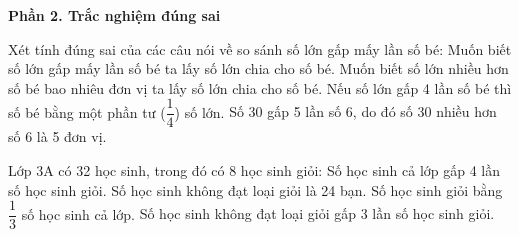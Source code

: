 \textbf{Phần 2. Trắc nghiệm đúng sai}

\begin{ex} %
Xét tính đúng sai của các câu nói về so sánh số lớn gấp mấy lần số bé:
\choiceTF
{\True Muốn biết số lớn gấp mấy lần số bé ta lấy số lớn chia cho số bé.}
{Muốn biết số lớn nhiều hơn số bé bao nhiêu đơn vị ta lấy số lớn chia cho số bé.}
{\True Nếu số lớn gấp 4 lần số bé thì số bé bằng một phần tư ($\dfrac{1}{4}$) số lớn.}
{Số 30 gấp 5 lần số 6, do đó số 30 nhiều hơn số 6 là 5 đơn vị.}
\end{ex}

\begin{ex} %
Lớp 3A có 32 học sinh, trong đó có 8 học sinh giỏi:
\choiceTF
{\True Số học sinh cả lớp gấp 4 lần số học sinh giỏi.}
{\True Số học sinh không đạt loại giỏi là 24 bạn.}
{Số học sinh giỏi bằng $\dfrac{1}{3}$ số học sinh cả lớp.}
{\True Số học sinh không đạt loại giỏi gấp 3 lần số học sinh giỏi.}
\end{ex}


